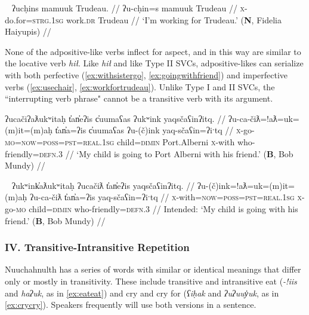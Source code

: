 \ex~ \label{ex:workfortrudeau}
\begingl
\glpreamble ʔucḥins mamuuk Trudeau. //
\gla ʔu-cḥin=s mamuuk Trudeau //
\glb \textsc{x}-do.for=\textsc{strg.1sg} work.\textsc{dr} Trudeau //
\glft `I'm working for Trudeau.' (\textbf{N}, Fidelia Haiyupis) //
\endgl
\xe

None of the adpositive-like verbs inflect for aspect, and in this way are similar to the locative verb \textit{hił}. Like \textit{hił} and like Type II SVCs, adpositive-likes can serialize with both perfective (\ref{ex:withsistergo}, \ref{ex:goingwithfriend}) and imperfective verbs (\ref{ex:usechair}, \ref{ex:workfortrudeau}). Unlike Type I and II SVCs, the ``interrupting verb phrase" cannot be a transitive verb with its argument.

\ex \label{ex:goingwithfriend}
\begingl
\glpreamble ʔucačiʔaƛukʷitaḥ t̓an̓eʔis c̓uumaʕas ʔukʷink yaqsčaʕinʔitq. //
\gla ʔu-ca-čiƛ=!aƛ=uk=(m)it=(m)aḥ t̓an̓a=ʔis c̓uumaʕas ʔu-(č)ink yaq-sčaʕin=ʔiˑtq //
\glb \textsc{x}-go-\textsc{mo}=\textsc{now}=\textsc{poss}=\textsc{pst}=\textsc{real.1sg} child=\textsc{dimin} Port.Alberni \textsc{x}-with who-friendly=\textsc{defn.3} //
\glft `My child is going to Port Alberni with his friend.' (\textbf{B}, Bob Mundy) //
\endgl
\xe

\ex~ \label{ex:*goingwithfriend}
\begingl
\glpreamble *ʔukʷink̓aƛukʷitaḥ ʔucačiƛ t̓an̓eʔis yaqsčaʕinʔitq. //
\gla ʔu-(č)ink=!aƛ=uk=(m)it=(m)aḥ ʔu-ca-čiƛ t̓an̓a=ʔis yaq-sčaʕin=ʔiˑtq //
\glb \textsc{x}-with=\textsc{now}=\textsc{poss}=\textsc{pst}=\textsc{real.1sg} \textsc{x}-go-\textsc{mo} child=\textsc{dimin} who-friendly=\textsc{defn.3} //
\glft Intended: `My child is going with his friend.' (\textbf{B}, Bob Mundy) //
\endgl
\xe


\vspace{10pt}

\subsubsection{IV. Transitive-Intransitive Repetition}

\vspace{10pt}

Nuuchahnulth has a series of words with similar or identical meanings that differ only or mostly in transitivity. These include transitive and intransitive eat (\textit{-!iis} and \textit{haʔuk}, as in \ref{ex:eateat}) and cry and cry for (\textit{ʕiḥak} and \textit{ʔuʔuuy̓uk}, as in \ref{ex:crycry}). Speakers frequently will use both versions in a sentence.

